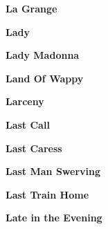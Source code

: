 \vspace{10pt} 
\begin{center}\textbf{La Grange}\end{center}
\newline
\vspace{10pt} 
\begin{center}\textbf{Lady}\end{center}
\newline
\vspace{10pt} 
\begin{center}\textbf{Lady Madonna}\end{center}
\newline
\vspace{10pt} 
\begin{center}\textbf{Land Of Wappy}\end{center}
\newline
\vspace{10pt} 
\begin{center}\textbf{Larceny}\end{center}
\newline
\vspace{10pt} 
\begin{center}\textbf{Last Call}\end{center}
\newline
\vspace{10pt} 
\begin{center}\textbf{Last Caress}\end{center}
\newline
\vspace{10pt} 
\begin{center}\textbf{Last Man Swerving}\end{center}
\newline
\vspace{10pt} 
\begin{center}\textbf{Last Train Home}\end{center}
\newline
\vspace{10pt} 
\begin{center}\textbf{Late in the Evening}\end{center}
